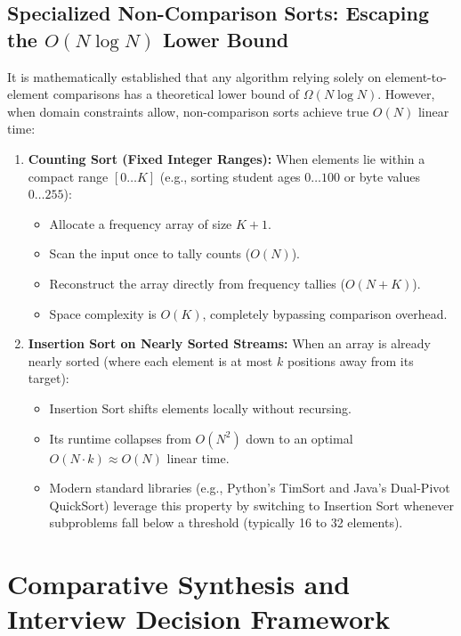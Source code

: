\documentclass[10pt,journal,compsoc,onecolumn]{IEEEtran}
\begin{document}
\subsection{Specialized Non-Comparison Sorts: Escaping the $O(N \log N)$ Lower Bound}

It is mathematically established that any algorithm relying solely on element-to-element comparisons has a theoretical lower bound of $\Omega(N \log N)$. However, when domain constraints allow, non-comparison sorts achieve true $O(N)$ linear time:
\begin{enumerate}
    \item \textbf{Counting Sort (Fixed Integer Ranges):} When elements lie within a compact range $[0 \dots K]$ (e.g., sorting student ages $0 \dots 100$ or byte values $0 \dots 255$):
    \begin{itemize}
        \item Allocate a frequency array of size $K + 1$.
        \item Scan the input once to tally counts ($O(N)$).
        \item Reconstruct the array directly from frequency tallies ($O(N + K)$).
        \item Space complexity is $O(K)$, completely bypassing comparison overhead.
    \end{itemize}
    \item \textbf{Insertion Sort on Nearly Sorted Streams:} When an array is already nearly sorted (where each element is at most $k$ positions away from its target):
    \begin{itemize}
        \item Insertion Sort shifts elements locally without recursing.
        \item Its runtime collapses from $O(N^2)$ down to an optimal $O(N \cdot k) \approx O(N)$ linear time.
        \item Modern standard libraries (e.g., Python's TimSort and Java's Dual-Pivot QuickSort) leverage this property by switching to Insertion Sort whenever subproblems fall below a threshold (typically 16 to 32 elements).
    \end{itemize}
\end{enumerate}

\section{Comparative Synthesis and Interview Decision Framework}
\label{sec:synthesis}
\end{document}
